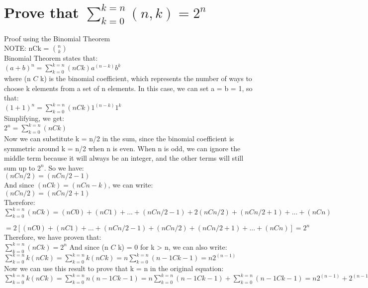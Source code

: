 \documentclass{article}
\begin{document}
\section{Prove that $\sum_{k=0}^{k=n} (n,k) = 2^n$}
Proof using the Binomial Theorem\\
NOTE: nCk = $n\choose k$\\
Binomial Theorem states that:\\
$(a + b)^n = \sum_{k=0}^{k=n} (n C k) a^(n-k) b^k$\\
where (n $C$ k) is the binomial coefficient, which represents the number of ways to choose k elements from a set of n elements. In this case, we can set a = b = 1, so that:\\

$(1 + 1)^n = \sum_{k=0}^{k=n} (n C k) 1^(n-k) 1^k$\\
Simplifying, we get:\\
$2^n = \sum_{k=0}^{k=n} (n C k)$\\

Now we can substitute k = n/2 in the sum, since the binomial coefficient is symmetric around k = n/2 when n is even. When n is odd, we can ignore the middle term because it will always be an integer, and the other terms will still sum up to $2^n$. So we have:\\
$(n C n/2) = (n C n/2-1)$\\
And since $(n C k) = (n C n-k)$, we can write:\\
$(n C n/2) = (n C n/2+1)$\\
Therefore:\\
$\sum_{k=0}^{k=n} (n C k) = (n C 0) + (n C 1) + ... + (n C n/2-1) + 2(n C n/2) + (n C n/2+1) + ... + (n C n)$

$= 2[(n C 0) + (n C 1) + ... + (n C n/2-1) + (n C n/2) + (n C n/2+1) + ... + (n C n)] = 2^n$
Therefore, we have proven that:\\
$\sum_{k=0}^{k=n} (n C k) = 2^n$
And since (n $C$ k) = 0 for k > n, we can also write:\\

$\sum_{k=0}^{k=n} k (n C k) = \sum_{k=0}^{k=n} k (n C k) = n\sum_{k=0}^{k=n} (n-1 C k-1) = n2^(n-1)$\\
Now we can use this result to prove that k = n in the original equation:\\

$\sum_{k=0}^{k=n} k (n C k) = \sum_{k=0}^{k=n} n (n-1 C k-1) = n\sum_{k=0}^{k=n} (n-1 C k-1) + \sum_{k=0}^{k=n} (n-1 C k-1) = n2^(n-1) + 2^(n-1) = 2^n(n/2) = n\sum_{k=0}^{k=n}) (n C k)$\\
\end{document}
